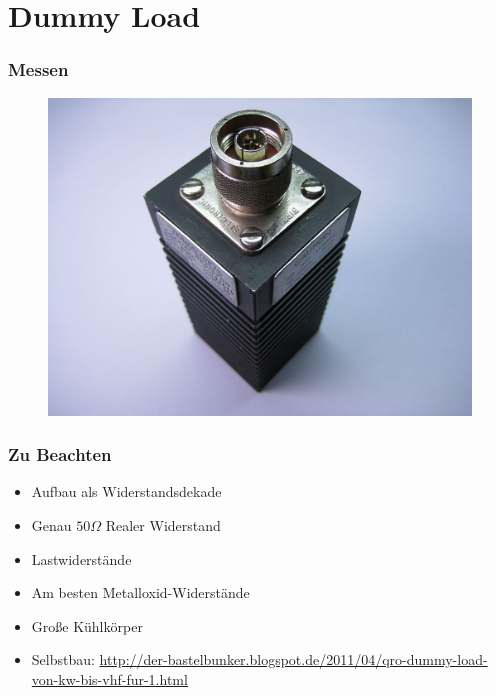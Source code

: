 \section*{Dummy Load}

\begin{frame}
  \frametitle{Messen}
  \begin{center}
    \begin{figure}
      \includegraphics[width=.99\textwidth,height=.75\textheight,keepaspectratio]{e17/DummyLoad.jpg}
    \end{figure}
  \end{center}
\end{frame}

\begin{frame}
  \frametitle{Zu Beachten}
  \begin{itemize}
    \item Aufbau als Widerstandsdekade
    \item Genau $50 \Omega$ Realer Widerstand
    \item Lastwiderstände
    \item Am besten Metalloxid-Widerstände
    \item Große Kühlkörper
    \item Selbstbau: \url{http://der-bastelbunker.blogspot.de/2011/04/qro-dummy-load-von-kw-bis-vhf-fur-1.html}
  \end{itemize}
\end{frame}


